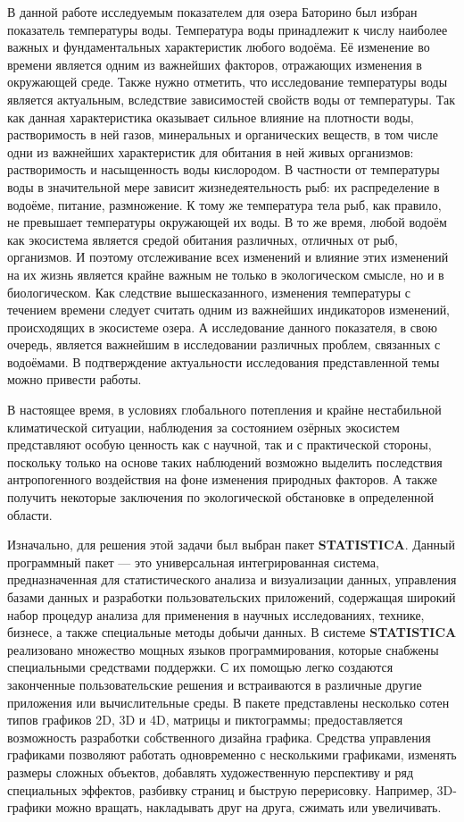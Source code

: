 В данной работе исследуемым показателем для озера Баторино был избран показатель температуры воды. Температура воды принадлежит к числу наиболее важных и фундаментальных характеристик любого водоёма. Её изменение во времени является одним из важнейших факторов, отражающих изменения в окружающей среде. Также нужно отметить, что исследование температуры воды является актуальным, вследствие зависимостей свойств воды от температуры. Так как данная характеристика оказывает сильное влияние на плотности воды, растворимость в ней газов, минеральных и органических веществ, в том числе одни из важнейших характеристик для обитания в ней живых организмов: растворимость и насыщенность воды кислородом. В частности от температуры воды в значительной мере зависит жизнедеятельность рыб: их распределение в водоёме, питание, размножение. К тому же температура тела рыб, как правило, не превышает температуры окружающей их воды. В то же время, любой водоём как экосистема является средой обитания различных, отличных от рыб, организмов. И поэтому отслеживание всех изменений и влияние этих изменений на их жизнь является крайне важным не только в экологическом смысле, но и в биологическом. Как следствие вышесказанного, изменения температуры с течением времени следует считать одним из важнейших индикаторов изменений, происходящих в экосистеме озера. А исследование данного показателя, в свою очередь, является важнейшим в исследовании различных проблем, связанных с водоёмами. В подтверждение актуальности исследования представленной темы можно привести работы. 

В настоящее время, в условиях глобального потепления и крайне нестабильной климатической ситуации, наблюдения за состоянием озёрных экосистем представляют особую ценность как с научной, так и с практической стороны, поскольку только на основе таких наблюдений возможно выделить последствия антропогенного воздействия на фоне изменения природных факторов. А также получить некоторые заключения по экологической обстановке в определенной области.

Изначально, для решения этой задачи был выбран пакет \textbf{STATISTICA}. Данный программный пакет --- это универсальная интегрированная система, предназначенная для статистического анализа и визуализации данных, управления базами данных и разработки пользовательских приложений, содержащая широкий набор процедур анализа для применения в научных исследованиях, технике, бизнесе, а также специальные методы добычи данных.
В системе \textbf{STATISTICA} реализовано множество мощных языков программирования, которые снабжены специальными средствами поддержки. С их помощью легко создаются законченные пользовательские решения и встраиваются в различные другие приложения или вычислительные среды. 
В пакете представлены несколько сотен типов графиков 2D, 3D и 4D, матрицы и пиктограммы; предоставляется возможность разработки собственного дизайна графика. Средства управления графиками позволяют работать одновременно с несколькими графиками, изменять размеры сложных объектов, добавлять художественную перспективу и ряд специальных эффектов, разбивку страниц и быструю перерисовку. Например, 3D-графики можно вращать, накладывать друг на друга, сжимать или увеличивать.


